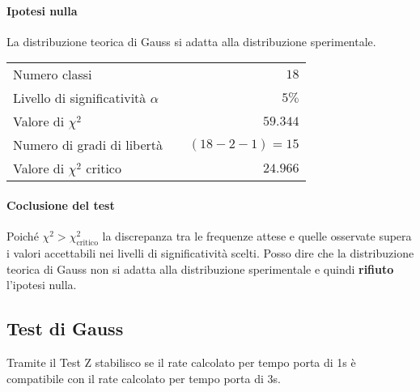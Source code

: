 \documentclass{article}
\begin{document}
\paragraph{Ipotesi nulla} La distribuzione teorica di Gauss si adatta alla distribuzione sperimentale.

\vspace{0.2cm}
\begin{center}
\begin{tabular}{lr}
	Numero classi & $18$ \\
	Livello di significatività $\alpha$		& $ \quad 5\%$  \\
	Valore di $\chi ^2$             	& $\quad 59.344$       \\
	Numero di gradi di libertà      	& $\quad (18-2-1) = 15$         \\   
	Valore di $\chi ^2$ critico     	& $\quad 24.966$
\end{tabular}
\end{center}

\paragraph{Coclusione del test} Poiché $\chi^2 > \chi^2_{\text{critico}}$ la discrepanza tra le frequenze attese e quelle osservate supera i valori accettabili nei livelli di significatività scelti. Posso dire che la distribuzione teorica di Gauss non si adatta alla distribuzione sperimentale e quindi \textbf{rifiuto} l'ipotesi nulla.


\begin{center}
\end{center}


\newpage
\subsection{Test di Gauss}
Tramite il Test Z stabilisco se il rate calcolato per tempo porta di 1s è compatibile con il rate calcolato per tempo porta di 3s.
\end{document}
